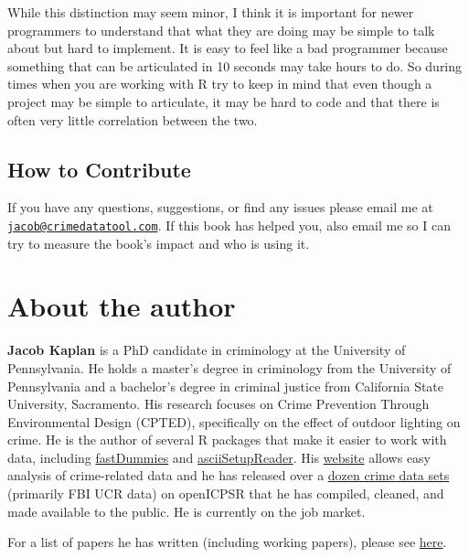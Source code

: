 \documentclass[
  12pt,
]{book}
\begin{document}
While this distinction may seem minor, I think it is important for newer programmers to understand that what they are doing may be simple to talk about but hard to implement. It is easy to feel like a bad programmer because something that can be articulated in 10 seconds may take hours to do. So during times when you are working with R try to keep in mind that even though a project may be simple to articulate, it may be hard to code and that there is often very little correlation between the two.

\hypertarget{how-to-contribute}{%
\section*{How to Contribute}\label{how-to-contribute}}

If you have any questions, suggestions, or find any issues please email me at \href{mailto:jacob@crimedatatool.com}{\nolinkurl{jacob@crimedatatool.com}}. If this book has helped you, also email me so I can try to measure the book's impact and who is using it.

\hypertarget{about-the-author}{%
\chapter*{About the author}\label{about-the-author}}

\textbf{Jacob Kaplan} is a PhD candidate in criminology at the University of Pennsylvania. He holds a master's degree in criminology from the University of Pennsylvania and a bachelor's degree in criminal justice from California State University, Sacramento. His research focuses on Crime Prevention Through Environmental Design (CPTED), specifically on the effect of outdoor lighting on crime. He is the author of several R packages that make it easier to work with data, including \href{https://jacobkap.github.io/fastDummies/}{fastDummies} and \href{https://jacobkap.github.io/asciiSetupReader/}{asciiSetupReader}. His \href{http://jacobdkaplan.com/}{website} allows easy analysis of crime-related data and he has released over a \href{http://jacobdkaplan.com/data.html}{dozen crime data sets} (primarily FBI UCR data) on openICPSR that he has compiled, cleaned, and made available to the public. He is currently on the job market.

For a list of papers he has written (including working papers), please see \href{http://jacobdkaplan.com/research.html}{here}.
\end{document}
